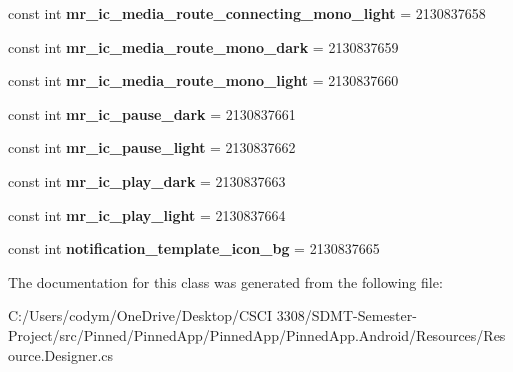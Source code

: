 \begin{DoxyCompactItemize}
const int {\bfseries mr\+\_\+ic\+\_\+media\+\_\+route\+\_\+connecting\+\_\+mono\+\_\+light} = 2130837658
\item 
\mbox{\label{class_pinned_app_1_1_droid_1_1_resource_1_1_drawable_aeb1a56473bddb98e799028aef42d0e49}} 
const int {\bfseries mr\+\_\+ic\+\_\+media\+\_\+route\+\_\+mono\+\_\+dark} = 2130837659
\item 
\mbox{\label{class_pinned_app_1_1_droid_1_1_resource_1_1_drawable_af60dce6c689ac17ba550e82fa7e1cce1}} 
const int {\bfseries mr\+\_\+ic\+\_\+media\+\_\+route\+\_\+mono\+\_\+light} = 2130837660
\item 
\mbox{\label{class_pinned_app_1_1_droid_1_1_resource_1_1_drawable_ac9c5cb7b0de2ad5cd4a3c5290f092e6a}} 
const int {\bfseries mr\+\_\+ic\+\_\+pause\+\_\+dark} = 2130837661
\item 
\mbox{\label{class_pinned_app_1_1_droid_1_1_resource_1_1_drawable_af558fa0dad3fce9794446f42201332e3}} 
const int {\bfseries mr\+\_\+ic\+\_\+pause\+\_\+light} = 2130837662
\item 
\mbox{\label{class_pinned_app_1_1_droid_1_1_resource_1_1_drawable_a5b5ca1dbd4feaf702a0e077b50edccdb}} 
const int {\bfseries mr\+\_\+ic\+\_\+play\+\_\+dark} = 2130837663
\item 
\mbox{\label{class_pinned_app_1_1_droid_1_1_resource_1_1_drawable_af03cfcc32368b847f8e95e5a7c0d2c67}} 
const int {\bfseries mr\+\_\+ic\+\_\+play\+\_\+light} = 2130837664
\item 
\mbox{\label{class_pinned_app_1_1_droid_1_1_resource_1_1_drawable_a409814d649d9b14040674cccd4fe263b}} 
const int {\bfseries notification\+\_\+template\+\_\+icon\+\_\+bg} = 2130837665
\end{DoxyCompactItemize}


The documentation for this class was generated from the following file\+:\begin{DoxyCompactItemize}
\item 
C\+:/\+Users/codym/\+One\+Drive/\+Desktop/\+C\+S\+C\+I 3308/\+S\+D\+M\+T-\/\+Semester-\/\+Project/src/\+Pinned/\+Pinned\+App/\+Pinned\+App/\+Pinned\+App.\+Android/\+Resources/Resource.\+Designer.\+cs\end{DoxyCompactItemize}
